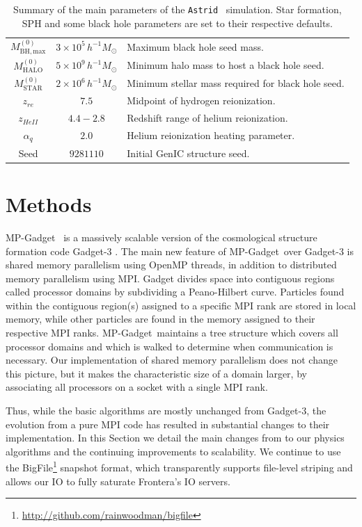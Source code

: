 \documentclass[fleqn,usenatbib]{mnras}
\newcommand{\msunh}{\,h^{-1}\unit{M_\odot}}
\newcommand{\software}[1]{{\small #1}}
\newcommand{\mpgadget}{\software{MP-Gadget}}
\def\astrid{\texttt{Astrid} }
\begin{document}
\begin{table}
\begin{tabular}{ccl}
    $M^{(0)}_\mathrm{BH,max}$ &    $3\times 10^{5}\msunh$ &  Maximum black hole seed mass.\\
    $M^{(0)}_\mathrm{HALO}$ &    $5\times10^{9}\msunh$ &    Minimum halo mass to host a black hole seed.\\
    $M^{(0)}_\mathrm{STAR}$ &    $2\times10^{6}\msunh$ &    Minimum stellar mass required for black hole seed.\\
    $z_{re}$ & $7.5$ & Midpoint of hydrogen reionization. \\
    $z_{HeII}$ & $4.4 - 2.8$ & Redshift range of helium reionization. \\
    $\alpha_q$ & $2.0$ & Helium reionization heating parameter. \\
    Seed & $9281110$ & Initial GenIC structure seed. \\
    \hline
  \end{tabular}
  \caption{Summary of the main parameters of the \astrid~simulation. Star formation, SPH and some black hole parameters are set to their respective defaults.}
  \label{tab:simparam}
\end{table}

\section{Methods}
\label{sec:methods}

\mpgadget~\citep{MPGadget2018} is a massively scalable version of the cosmological structure formation code Gadget-3 \citep{Springel:2005}. The main new feature of \mpgadget~over Gadget-3 is shared memory parallelism using OpenMP threads, in addition to distributed memory parallelism using MPI. Gadget divides space into contiguous regions called processor domains by subdividing a Peano-Hilbert curve. Particles found within the contiguous region(s) assigned to a specific MPI rank are stored in local memory, while other particles are found in the memory assigned to their respective MPI ranks. \mpgadget~maintains a tree structure which covers all processor domains and which is walked to determine when communication is necessary. Our implementation of shared memory parallelism does not change this picture, but it makes the characteristic size of a domain larger, by associating all processors on a socket with a single MPI rank. 

Thus, while the basic algorithms are mostly unchanged from Gadget-3, the evolution from a pure MPI code has resulted in substantial changes to their implementation. In this Section we detail the main changes from \cite{Feng:2016} to our physics algorithms and the continuing improvements to scalability. %
We continue to use the \software{BigFile}\footnote{\url{http://github.com/rainwoodman/bigfile}} snapshot format, which transparently supports file-level striping and allows our IO to fully saturate Frontera's IO servers.
\end{document}
